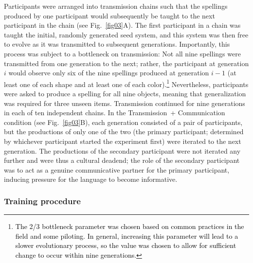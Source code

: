 \documentclass[doc,biblatex]{apa7}
\newcommand\firstrevision[1]{\textcolor{black}{#1}}
\begin{document}
Participants were arranged into transmission chains such that the spellings produced by one participant would subsequently be taught to the next participant in the chain (see Fig.~\ref{fig03}A). The first participant in a chain was taught the initial, randomly generated seed system, and this system was then free to evolve as it was transmitted to subsequent generations. Importantly, this process was subject to a bottleneck on transmission: Not all nine spellings were transmitted from one generation to the next; rather, the participant at generation $i$ would observe only six of the nine spellings produced at generation $i-1$ (at least one of each shape and at least one of each color).\footnote{\firstrevision{The 2/3 bottleneck parameter was chosen based on common practices in the field and some piloting. In general, increasing this parameter will lead to a slower evolutionary process, so the value was chosen to allow for sufficient change to occur within nine generations.}} Nevertheless, participants were asked to produce a spelling for all nine objects, meaning that generalization was required for three unseen items. Transmission continued for nine generations in each of ten independent chains. In the Transmission~+ Communication condition (see Fig.~\ref{fig03}B), each generation consisted of a pair of participants, but the productions of only one of the two (the primary participant; determined by whichever participant started the experiment first) were iterated to the next generation. The productions of the secondary participant were not iterated any further and were thus a cultural deadend; the role of the secondary participant was to act as a genuine communicative partner for the primary participant, inducing pressure for the language to become informative.

\subsubsection{Training procedure}
\end{document}
